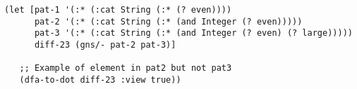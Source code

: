 \begin{lstlisting}[style=reclojureClojure]
(let [pat-1 '(:* (:cat String (:* (? even))))
      pat-2 '(:* (:cat String (:* (and Integer (? even)))))
      pat-3 '(:* (:cat String (:* (and Integer (? even) (? large)))))
      diff-23 (gns/- pat-2 pat-3)]

   ;; Example of element in pat2 but not pat3
   (dfa-to-dot diff-23 :view true))
\end{lstlisting}
